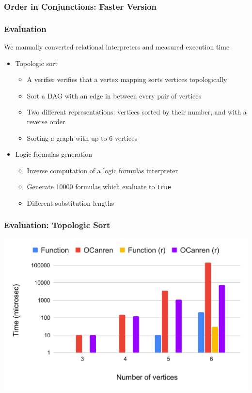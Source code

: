 \documentclass[xcolor=table]{beamer}
\begin{document}
\begin{frame}[fragile]
  \frametitle{Order in Conjunctions: Faster Version}
  
\end{frame}


\begin{frame}[fragile]
  \frametitle{Evaluation}
  \begin{center}
    We manually converted relational interpreters and measured execution time
  \end{center}

  \begin{itemize}
    \item Topologic sort
    \begin{itemize}
      \item A verifier verifies that a vertex mapping sorts vertices topologically
      \item Sort a DAG with an edge in between every pair of vertices
      \item Two different representations: vertices sorted by their number, and with a reverse order
      \item Sorting a graph with up to 6 vertices
    \end{itemize}
    \item Logic formulas generation
    \begin{itemize}
      \item Inverse computation of a logic formulas interpreter
      \item Generate 10000 formulas which evaluate to \texttt{true}
      \item Different substitution lengths
    \end{itemize}
  \end{itemize}
\end{frame}

\begin{frame}[fragile]
  \frametitle{Evaluation: Topologic Sort}
  \includegraphics[width=\textwidth]{fig/eval/topsort.pdf}
\end{frame}
\end{document}
